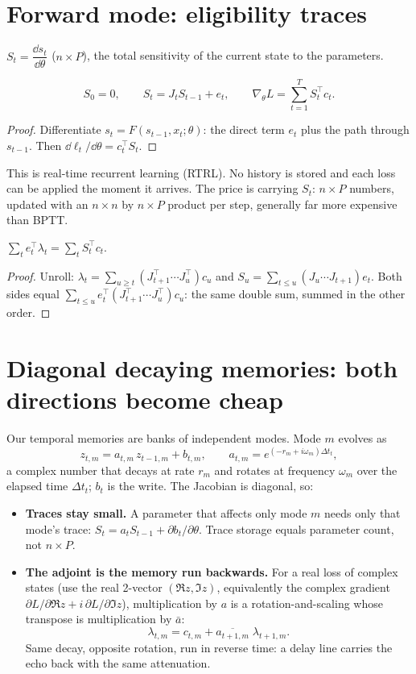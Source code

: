 \documentclass[11pt]{article}
\begin{document}
\section{Forward mode: eligibility traces}
\begin{definition} $S_t=\dfrac{\dd s_t}{\dd\theta}$ ($n\times P$), the total sensitivity of the current state to the parameters.\end{definition}
\begin{proposition}
\[
S_0=0,\qquad S_t=J_tS_{t-1}+e_t,\qquad \nabla_\theta L=\sum_{t=1}^T S_t^{\top}c_t .
\]
\end{proposition}
\begin{proof}
Differentiate $s_t=F(s_{t-1},x_t;\theta)$: the direct term $e_t$ plus the path through $s_{t-1}$. Then $\dd\ell_t/\dd\theta=c_t^\top S_t$.
\end{proof}
This is real-time recurrent learning (RTRL). No history is stored and each loss can be applied the moment it arrives. The price
is carrying $S_t$: $n\times P$ numbers, updated with an $n\times n$ by $n\times P$ product per step, generally far more
expensive than BPTT.

\begin{proposition}
$\sum_t e_t^\top\lambda_t=\sum_t S_t^\top c_t$.
\end{proposition}
\begin{proof}
Unroll: $\lambda_t=\sum_{u\ge t}(J_{t+1}^\top\cdots J_u^\top)c_u$ and $S_u=\sum_{t\le u}(J_u\cdots J_{t+1})e_t$. Both sides equal
$\sum_{t\le u} e_t^\top (J_{t+1}^\top\cdots J_u^\top) c_u$: the same double sum, summed in the other order.
\end{proof}

\section{Diagonal decaying memories: both directions become cheap}
Our temporal memories are banks of independent modes. Mode $m$ evolves as
\[
z_{t,m}=a_{t,m}\,z_{t-1,m}+b_{t,m},\qquad a_{t,m}=e^{(-r_m+i\omega_m)\Delta t_t},
\]
a complex number that decays at rate $r_m$ and rotates at frequency $\omega_m$ over the elapsed time $\Delta t_t$; $b_t$ is the
write. The Jacobian is diagonal, so:
\begin{itemize}
\item \textbf{Traces stay small.} A parameter that affects only mode $m$ needs only that mode's trace: $S_{t}=a_{t}S_{t-1}+\partial b_t/\partial\theta$.
Trace storage equals parameter count, not $n\times P$.
\item \textbf{The adjoint is the memory run backwards.} For a real loss of complex states (use the real 2-vector
$(\Re z,\Im z)$, equivalently the complex gradient $\partial L/\partial\Re z+i\,\partial L/\partial\Im z$), multiplication by $a$
is a rotation-and-scaling whose transpose is multiplication by $\bar a$:
\[
\lambda_{t,m}=c_{t,m}+\overline{a_{t+1,m}}\;\lambda_{t+1,m}.
\]
Same decay, opposite rotation, run in reverse time: a delay line carries the echo back with the same attenuation.
\end{itemize}
\end{document}
